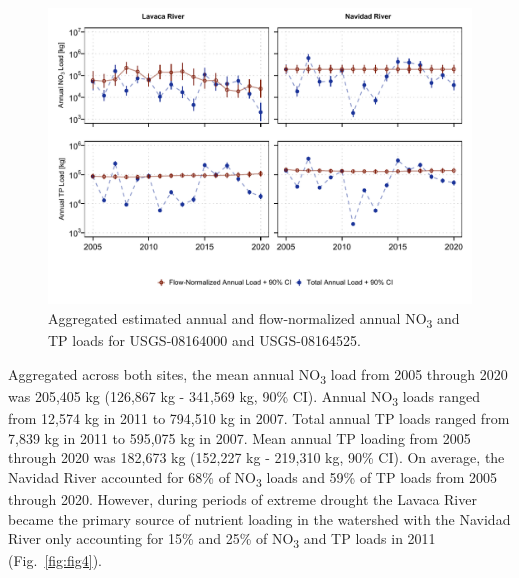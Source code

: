 \documentclass[fleqn,10pt,lineno]{wlpeerj} %
\begin{document}
\begin{figure}

{\centering \includegraphics[width=1\linewidth,]{Schramm-2023-08-PeerJ_files/figure-latex/fig3} 

}

\caption{Aggregated estimated annual and flow-normalized annual NO\textsubscript{3} and TP loads for USGS-08164000 and USGS-08164525.}\label{fig:fig3}
\end{figure}

Aggregated across both sites, the mean annual NO\textsubscript{3} load
from 2005 through 2020 was 205,405 kg (126,867 kg - 341,569 kg, 90\%
CI). Annual NO\textsubscript{3} loads ranged from 12,574 kg in 2011 to
794,510 kg in 2007. Total annual TP loads ranged from 7,839 kg in 2011
to 595,075 kg in 2007. Mean annual TP loading from 2005 through 2020 was
182,673 kg (152,227 kg - 219,310 kg, 90\% CI). On average, the Navidad
River accounted for 68\% of NO\textsubscript{3} loads and 59\% of TP
loads from 2005 through 2020. However, during periods of extreme drought
the Lavaca River became the primary source of nutrient loading in the
watershed with the Navidad River only accounting for 15\% and 25\% of
NO\textsubscript{3} and TP loads in 2011 (Fig.~\ref{fig:fig4}).
\end{document}
